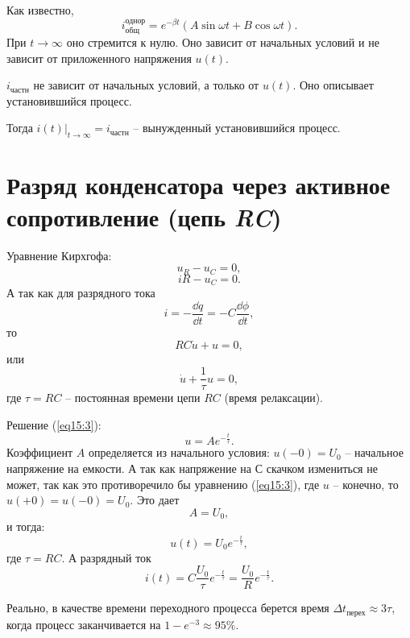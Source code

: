 	Как известно,
    \[
        i_{\textit{общ}}^{\text{однор}} = e^{-\beta t}(A\sin\omega t +
        B\cos\omega t).
    \]
    При \( t \to \infty \) оно стремится к нулю. Оно зависит от начальных
    условий и не зависит от приложенного напряжения \( u(t) \).
	
	\( i_{\textit{частн}} \) не зависит от начальных условий, а только от
    \( u(t) \). Оно описывает установившийся процесс.
	
	Тогда \( \left.i(t)\right|_{t\to\infty} =  i_{\textit{частн}} \) --
    вынужденный установившийся процесс.
	
\section{Разряд конденсатора через активное сопротивление (цепь \textit{RC})}

	Уравнение Кирхгофа:
	\[ u_R - u_C = 0, \]
	\[ iR - u_C = 0. \]
	А так как для разрядного тока
    \[
        i = -\frac{\dd q}{\dd t} = -C\frac{\dd \phi}{\dd t},
    \]
    то
	\[ RC\dot{u} + u = 0, \]
	или
	\begin{equation}
		\dot{u} + \frac{1}{\tau}u = 0,
        \label{eq15:3}
	\end{equation}
	где \( \tau = RC \) -- постоянная времени цепи \(  RC \) (время релаксации).
	
	Решение (\ref{eq15:3}):
	\[
        u = Ae^{-\frac{t}{\tau}}.
    \]
	Коэффициент \( A \) определяется из начального условия: \( u(-0) = U_0 \)
    -- начальное напряжение на емкости.	А так как напряжение на \( С \) скачком
    измениться не может, так как это противоречило бы уравнению (\ref{eq15:3}),
    где \( u \) -- конечно, то \( u(+0) = u(-0) = U_0 \). Это дает
    \[
        A = U_0,
    \]
	и тогда:
	\begin{equation}
		u(t) = U_0e^{-\frac{t}{\tau}},
        \label{eq15:4}
	\end{equation}
	где \( \tau = RC \). А разрядный ток
	\begin{equation}
		i(t) = C\frac{U_0}{\tau}e^{-\frac{t}{\tau}} =
        \frac{U_0}{R}e^{-\frac{t}{\tau}}.
	\end{equation}
	
	\begin{remark}
	    Реально, в качестве времени переходного процесса берется время
        \( \Delta t_{\textit{перех}} \approx 3\tau \), когда процесс
        заканчивается на \( 1 - e^{-3} \approx 95\% \).
	\end{remark}
	
